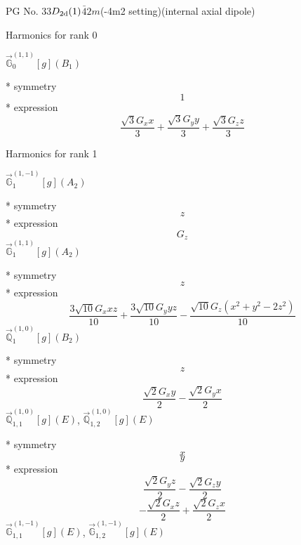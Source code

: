 \documentclass[fleqn,8pt]{jsarticle}
\begin{document}
\setcounter{MaxMatrixCols}{32}

\renewcommand{\tablename}{Table~}
\renewcommand{\figurename}{Figure~}
\begin{center}
\LARGE
PG No. 33\quad$D_{\rm 2d}(1)$\quad$\bar{4}2m$\quad(-4m2 setting)\quad[ tetragonal ] (internal axial dipole)
\end{center}

\noindent * Harmonics for rank 0

\noindent\quad $\vec{\mathbb{G}}_{0}^{(1,1)}[g](B_{1})$

\noindent\quad ** symmetry
\begin{dmath*}
1
\end{dmath*}
\noindent\quad ** expression
\begin{dmath*}
\frac{\sqrt{3} G_{x} x}{3} + \frac{\sqrt{3} G_{y} y}{3} + \frac{\sqrt{3} G_{z} z}{3}
\end{dmath*}

\noindent * Harmonics for rank 1

\noindent\quad $\vec{\mathbb{G}}_{1}^{(1,-1)}[g](A_{2})$

\noindent\quad ** symmetry
\begin{dmath*}
z
\end{dmath*}
\noindent\quad ** expression
\begin{dmath*}
G_{z}
\end{dmath*}
\noindent\quad $\vec{\mathbb{G}}_{1}^{(1,1)}[g](A_{2})$

\noindent\quad ** symmetry
\begin{dmath*}
z
\end{dmath*}
\noindent\quad ** expression
\begin{dmath*}
\frac{3 \sqrt{10} G_{x} x z}{10} + \frac{3 \sqrt{10} G_{y} y z}{10} - \frac{\sqrt{10} G_{z} \left(x^{2} + y^{2} - 2 z^{2}\right)}{10}
\end{dmath*}
\noindent\quad $\vec{\mathbb{Q}}_{1}^{(1,0)}[g](B_{2})$

\noindent\quad ** symmetry
\begin{dmath*}
z
\end{dmath*}
\noindent\quad ** expression
\begin{dmath*}
\frac{\sqrt{2} G_{x} y}{2} - \frac{\sqrt{2} G_{y} x}{2}
\end{dmath*}
\noindent\quad $\vec{\mathbb{Q}}_{1,1}^{(1,0)}[g](E)$, $\vec{\mathbb{Q}}_{1,2}^{(1,0)}[g](E)$

\noindent\quad ** symmetry
\begin{dmath*}
x
\end{dmath*}
\begin{dmath*}
y
\end{dmath*}
\noindent\quad ** expression
\begin{dmath*}
\frac{\sqrt{2} G_{y} z}{2} - \frac{\sqrt{2} G_{z} y}{2}
\end{dmath*}
\begin{dmath*}
- \frac{\sqrt{2} G_{x} z}{2} + \frac{\sqrt{2} G_{z} x}{2}
\end{dmath*}
\noindent\quad $\vec{\mathbb{G}}_{1,1}^{(1,-1)}[g](E)$, $\vec{\mathbb{G}}_{1,2}^{(1,-1)}[g](E)$
\end{document}
